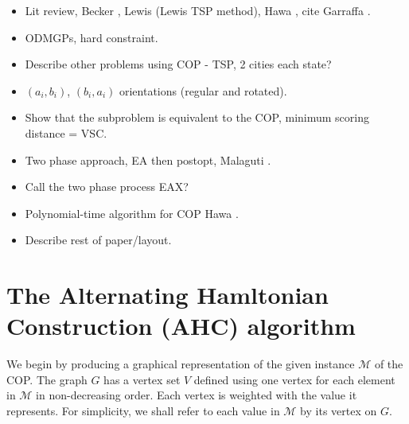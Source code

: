 \documentclass{elsarticle}
\begin{document}
{\color{Orange}
\begin{itemize}[leftmargin=*]
	\item Lit review, Becker \cite{becker2015}, Lewis \cite{lewis2011} (Lewis TSP method), Hawa \cite{hawa2018}, cite Garraffa \cite{garraffa2016}.
	\item ODMGPs, hard constraint.
	\item Describe other problems using COP - TSP, 2 cities each state?
	\item $(a_i, b_i)$, $(b_i, a_i)$ orientations (regular and rotated).
	\item Show that the subproblem is equivalent to the COP, minimum scoring distance = VSC.
	\item Two phase approach, EA then postopt, Malaguti \cite{malaguti2008}.
	\item Call the two phase process EAX?
	\item Polynomial-time algorithm for COP Hawa \cite{hawa2018}.
	\item Describe rest of paper/layout.
\end{itemize}
}


\section{The Alternating Hamltonian Construction (AHC) algorithm}
\label{sec:ahc}
We begin by producing a graphical representation of the given instance $\mathcal{M}$ of the COP. The graph $G$ has a vertex set $V$ defined using one vertex for each element in $\mathcal{M}$ in non-decreasing order. Each vertex is weighted with the value it represents. For simplicity, we shall refer to each value in $\mathcal{M}$ by its vertex on $G$.
\end{document}
